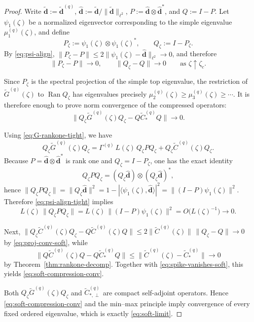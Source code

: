 \documentclass[11pt]{amsart}
\numberwithin{equation}{section}
\theoremstyle{plain}
\theoremstyle{definition}
\theoremstyle{remark}
\DeclareMathOperator{\Ran}{Ran}
\begin{document}
\begin{proof}
	Write $
		\widetilde{\bm d}:=\widetilde{\bm d}^{(q)}$,
		$\widehat{\bm d}:=\widetilde{\bm d}/\|\widetilde{\bm d}\|_{\ell^2}$,
		$
		P:=\widehat{\bm d}\otimes \widehat{\bm d}^{*}$,
		and $Q:=I-P$.
	Let \(\psi_1(\zeta)\) be a normalized eigenvector corresponding to the
	simple eigenvalue \(\mu_1^{(q)}(\zeta)\), and define
	\[
		P_\zeta:=\psi_1(\zeta)\otimes\psi_1(\zeta)^*,
		\qquad
		Q_\zeta:=I-P_\zeta.
	\]
	By \eqref{eq:psi-align}, $
		\|P_\zeta-P\|
		\le
		2\|\psi_1(\zeta)-\widehat{\bm d}\|_{\ell^2}\to0$,
	and therefore
	\begin{equation}\label{eq:proj-conv-soft}
		\|P_\zeta-P\|\to0,
		\qquad
		\|Q_\zeta-Q\|\to0
		\qquad\text{as }\zeta\uparrow\zeta_c.
	\end{equation}

	Since \(P_\zeta\) is the spectral projection of the simple top eigenvalue,
	the restriction of \(\widetilde G^{(q)}(\zeta)\) to \(\Ran Q_\zeta\) has
	eigenvalues precisely $\mu_2^{(q)}(\zeta)\ge \mu_3^{(q)}(\zeta)\ge\cdots$.	It is therefore enough to prove norm convergence of the compressed
	operators:
	\begin{equation}\label{eq:soft-compression-conv}
		\bigl\|
		Q_\zeta\widetilde G^{(q)}(\zeta)Q_\zeta
		-
		Q\widetilde C_*^{(q)}Q
		\bigr\|
		\longrightarrow0.
	\end{equation}

	Using \eqref{eq:G-rankone-tight}, we have
	\[
		Q_\zeta\widetilde G^{(q)}(\zeta)Q_\zeta
		=
		\Gamma^{(q)}\,L(\zeta)\,Q_\zeta P Q_\zeta
		+
		Q_\zeta\widetilde C^{(q)}(\zeta)Q_\zeta.
	\]
	Because \(P=\widehat{\bm d}\otimes\widehat{\bm d}^*\) is rank one and
	\(Q_\zeta=I-P_\zeta\), one has the exact identity
	\[
		Q_\zeta P Q_\zeta
		=
		(Q_\zeta\widehat{\bm d})\otimes(Q_\zeta\widehat{\bm d})^*,
	\]
	hence $
		\|Q_\zeta P Q_\zeta\|
		=
		\|Q_\zeta\widehat{\bm d}\|^2
		=
		1-|\langle\psi_1(\zeta),\widehat{\bm d}\rangle|^2
		=
		\|(I-P)\psi_1(\zeta)\|^2$.
	Therefore \eqref{eq:psi-align-tight} implies
	\begin{equation}\label{eq:spike-vanishes-soft}
		L(\zeta)\,\|Q_\zeta P Q_\zeta\|
		=
		L(\zeta)\,\|(I-P)\psi_1(\zeta)\|^2
		=
		O\bigl(L(\zeta)^{-1}\bigr)
		\longrightarrow0.
	\end{equation}

	Next, $
		\|Q_\zeta \widetilde C^{(q)}(\zeta)Q_\zeta
		-
		Q \widetilde C^{(q)}(\zeta)Q\|
		\le
		2\|\widetilde C^{(q)}(\zeta)\|\,\|Q_\zeta-Q\|
		\to0
	$
	by \eqref{eq:proj-conv-soft}, while
	\[
		\|Q \widetilde C^{(q)}(\zeta)Q-Q\widetilde C_*^{(q)}Q\|
		\le
		\|\widetilde C^{(q)}(\zeta)-\widetilde C_*^{(q)}\|
		\to0
	\]
	by Theorem~\ref{thm:rankone-decomp}. Together with
	\eqref{eq:spike-vanishes-soft}, this yields
	\eqref{eq:soft-compression-conv}.

	Both \(Q_\zeta\widetilde G^{(q)}(\zeta)Q_\zeta\) and
	\(\widetilde C_{*,\perp}^{(q)}\) are compact self-adjoint operators.
	Hence \eqref{eq:soft-compression-conv} and the min--max principle imply
	convergence of every fixed ordered eigenvalue, which is exactly
	\eqref{eq:soft-limit}.
\end{proof}
\end{document}
